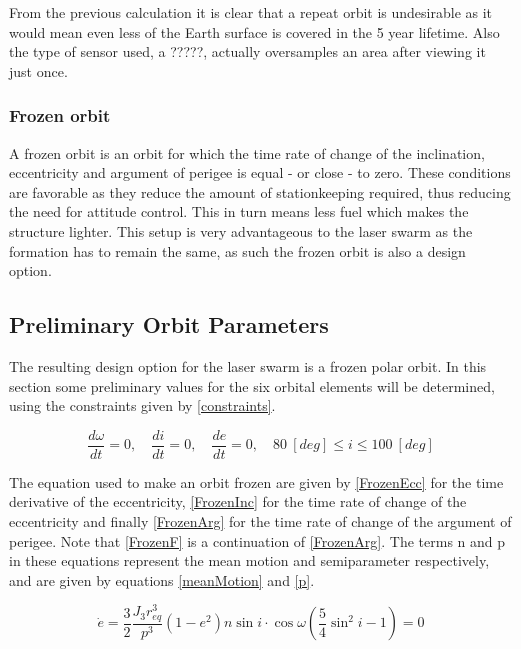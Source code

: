 \documentclass{article}
\begin{document}
From the previous calculation it is clear that a repeat orbit is undesirable as it would mean even less of the Earth surface is covered in the 5 year lifetime. Also the type of sensor used, a ?????, actually oversamples an area after viewing it just once.

\subsubsection{Frozen orbit}
A frozen orbit is an orbit for which the time rate of change of the inclination, eccentricity and argument of perigee is equal - or close - to zero. These conditions are favorable as they reduce the amount of stationkeeping required, thus reducing the need for attitude control. This in turn means less fuel which makes the structure lighter.
This setup is very advantageous to the laser swarm as the formation has to remain the same, as such the frozen orbit is also a design option.

\subsection{Preliminary Orbit Parameters}
The resulting design option for the laser swarm is a frozen polar orbit. In this section some preliminary values for the six orbital elements will be determined, using the constraints given by \ref{constraints}.

\begin{equation}
\frac{{d\omega }}{{dt}} = 0,\quad \frac{{di }}{{dt}} = 0,\quad \frac{{de }}{{dt}} = 0,\quad 80\ [deg] \leq i \leq 100\ [deg]
\label{constraints}
\end{equation}

The equation used to make an orbit frozen are given by \ref{FrozenEcc} for the time derivative of the eccentricity, \ref{FrozenInc} for the time rate of change of the eccentricity and finally \ref{FrozenArg} for the time rate of change of the argument of perigee. Note that \ref{FrozenF} is a continuation of \ref{FrozenArg}. The terms n and p in these equations represent the mean motion and semiparameter respectively, and are given by equations \ref{meanMotion} and \ref{p}.


\begin{equation}
\dot e = \frac{3}
{2}\frac{{J_3 r_{eq}^3 }}
{{p^3 }}\left( {1 - e^2 } \right)n\sin i \cdot \cos \omega \left( {\frac{5}
{4}\sin ^2 i - 1} \right) = 0
\label{FrozenEcc}
\end{equation}
\end{document}
